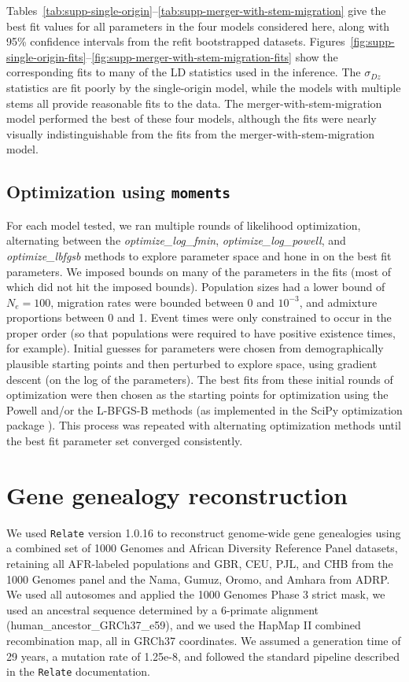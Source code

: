 \documentclass[]{article}
\newcommand{\moments}{\texttt{moments}\xspace}
\newcommand{\Relate}{\texttt{Relate}\xspace}
\begin{document}
Tables~\ref{tab:supp-single-origin}--\ref{tab:supp-merger-with-stem-migration}
give the best fit values for all parameters in the four models considered here,
along with 95\% confidence intervals from the refit bootstrapped datasets.
Figures~\ref{fig:supp-single-origin-fits}--\ref{fig:supp-merger-with-stem-migration-fits}
show the corresponding fits to many of the LD statistics used in the inference.
The $\sigma_{Dz}$ statistics are fit poorly by the single-origin model, while
the models with multiple stems all provide reasonable fits to the data. The
merger-with-stem-migration model performed the best of these four models,
although the fits were nearly visually indistinguishable from the fits from the
merger-with-stem-migration model.


\subsection{Optimization using \moments}
\label{sec:optimization}

For each model tested, we ran multiple rounds of likelihood optimization,
alternating between the \emph{optimize\_log\_fmin},
\emph{optimize\_log\_powell}, and \emph{optimize\_lbfgsb} methods to explore
parameter space and hone in on the best fit parameters.  We imposed bounds on
many of the parameters in the fits (most of which did not hit the imposed
bounds). Population sizes had a lower bound of $N_e=100$, migration rates were
bounded between 0 and $10^{-3}$, and admixture proportions between 0 and 1.
Event times were only constrained to occur in the proper order (so that
populations were required to have positive existence times, for example).
Initial guesses for parameters were chosen from demographically plausible
starting points and then perturbed to explore space, using gradient descent (on
the log of the parameters). The best fits from these initial rounds of
optimization were then chosen as the starting points for optimization using the
Powell and/or the L-BFGS-B methods (as implemented in the SciPy optimization
package \citep{Virtanen2020-kr}). This process was repeated with alternating
optimization methods until the best fit parameter set converged consistently.

\section{Gene genealogy reconstruction}
\label{sec:relate}

We used \Relate version 1.0.16 \citep{Speidel2019-nj} to reconstruct genome-wide
gene genealogies using a combined set of 1000 Genomes and African Diversity
Reference Panel datasets, retaining all AFR-labeled populations and GBR, CEU,
PJL, and CHB from the 1000 Genomes panel and the Nama, Gumuz, Oromo, and Amhara
from ADRP. We used all autosomes and applied the 1000 Genomes Phase 3 strict
mask, we used an ancestral sequence determined by a 6-primate alignment
(human\_ancestor\_GRCh37\_e59), and we used the HapMap II combined
recombination map, all in GRCh37 coordinates. We assumed a generation time of
29 years, a mutation rate of 1.25e-8, and followed the standard pipeline
described in the \Relate documentation.
\end{document}
